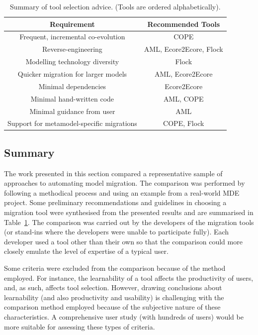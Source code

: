 \begin{table}[hbtp]
	\centering
	\caption[Summary of tool selection advice]{Summary of tool selection advice. (Tools are ordered alphabetically).}
	\label{tab:advice}
	\begin{tabular}{|c|c|}
	\hline
	\textbf{Requirement}    & \textbf{Recommended Tools} \\
	\hline
	Frequent, incremental co-evolution                & COPE \\
	\hline
	Reverse-engineering                               & AML, Ecore2Ecore, Flock \\
	\hline
	Modelling technology diversity                    & Flock \\
	\hline
	Quicker migration for larger models               & AML, Ecore2Ecore \\
	\hline
	Minimal dependencies                              & Ecore2Ecore \\
	\hline
	Minimal hand-written code                         & AML, COPE \\
	\hline
	Minimal guidance from user                        & AML \\
	\hline
	Support for metamodel-specific migrations   & COPE, Flock \\
	\hline
	\end{tabular}
\end{table}



\subsection{Summary}
The work presented in this section compared a representative sample of approaches to automating model migration. The comparison was performed by following a methodical process and using an example from a real-world MDE project. Some preliminary recommendations and guidelines in choosing a migration tool were synthesised from the presented results and are summarised in Table~\ref{tab:advice}. The comparison was carried out by the developers of the migration tools (or stand-ins where the developers were unable to participate fully). Each developer used a tool other than their own so that the comparison could more closely emulate the level of expertise of a typical user.

Some criteria were excluded from the comparison because of the method employed. For instance, the learnability of a tool affects the productivity of users, and, as such, affects tool selection. However, drawing conclusions about learnability (and also productivity and usability) is challenging with the comparison method employed because of the subjective nature of these characteristics. A comprehensive user study (with hundreds of users) would be more suitable for assessing these types of criteria.
